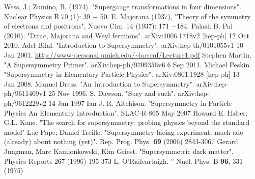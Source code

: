 \documentclass[12pt]{report}
\begin{document}
\begin{thebibliography}{999}
 Wess, J.; Zumino, B. (1974). "Supergauge transformations in four dimensions". Nuclear Physics B 70 (1): 39 $-$ 50.
 E. Majorana (1937), "Theory of the symmetry of electrons and positrons", Nuovo Cim. 14 (1937): 171 $-$184.
 Palash B. Pal (2010). "Dirac, Majorana and Weyl fermions". arXiv:1006.1718v2 [hep-ph] 12 Oct 2010.
 Adel Bilal. "Introduction to Supersymmetry". arXiv:hep-th/0101055v1 10 Jan 2001.
 \url{http://www-personal.umich.edu/~larsenf/Lecture1.pdf}
 Stephen Martin. "A Supersymmetry Primer". arXiv:hep-ph/9709356v6 6 Sep 2011.
 Michael Peskin. "Supersymmetry in Elementary Particle Physics". arXiv:0801.1928 [hep-ph] 13 Jan 2008.
 Manuel Dress. "An Introduction to Supersymmetry". arXiv:hep-ph/9611409v1 25 Nov 1996.
 S. Dawson. "Susy and such". arXiv:hep-ph/9612229v2 14 Jan 1997
 Ian J. R. Aitchison. "Supersymmetry in Particle Physics An Elementary Introduction". SLAC-R-865 May 2007
 Howard E. Haber; G.L. Kane. "The search for supersymmetry: probing physics beyond the standard model"
 Lue Pape; Daniel Treille. "Supersymmetry facing experiment: much ado (already) about nothing (yet)". Rep. Prog. Phys. \textbf{69} (2006) 2843-3067
 Gerard Jungman, Marc Kamionkowski, Kim Griest. "Supersymmetric dark matter". Physics Reports 267 (1996) 195-373
 L. O'Raifeartaigh. '' Nucl. Phys. B \textbf{96}, 331 (1975)
\end{thebibliography}
\end{document}
